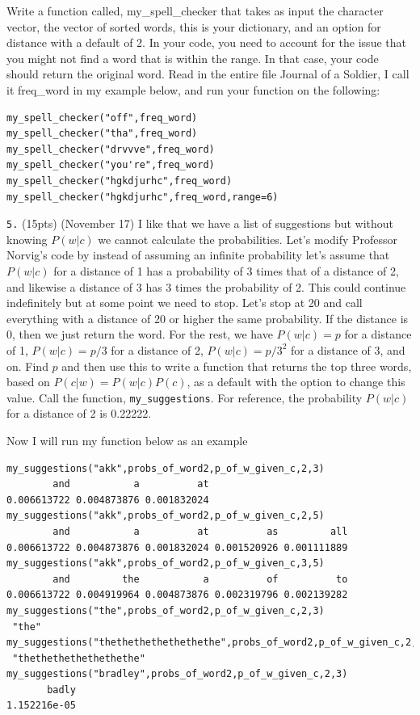 \documentclass[]{book}
\theoremstyle{definition}
\theoremstyle{definition}
\theoremstyle{definition}
\theoremstyle{remark}
\begin{document}
Write a function called, my\_spell\_checker that takes as input the
character vector, the vector of sorted words, this is your dictionary,
and an option for distance with a default of 2. In your code, you need
to account for the issue that you might not find a word that is within
the range. In that case, your code should return the original word. Read
in the entire file Journal of a Soldier, I call it freq\_word in my
example below, and run your function on the following:

\begin{verbatim}
my_spell_checker("off",freq_word)
my_spell_checker("tha",freq_word)
my_spell_checker("drvvve",freq_word)
my_spell_checker("you're",freq_word)
my_spell_checker("hgkdjurhc",freq_word)
my_spell_checker("hgkdjurhc",freq_word,range=6)
\end{verbatim}

\texttt{5.} (15pts) (November 17) I like that we have a list of
suggestions but without knowing \(P(w|c)\) we cannot calculate the
probabilities. Let's modify Professor Norvig's code by instead of
assuming an infinite probability let's assume that \(P(w|c)\) for a
distance of 1 has a probability of 3 times that of a distance of 2, and
likewise a distance of 3 has 3 times the probability of 2. This could
continue indefinitely but at some point we need to stop. Let's stop at
20 and call everything with a distance of 20 or higher the same
probability. If the distance is 0, then we just return the word. For the
rest, we have \(P(w|c)=p\) for a distance of 1, \(P(w|c)=p/3\) for a
distance of 2, \(P(w|c)=p/3^2\) for a distance of 3, and on. Find \(p\)
and then use this to write a function that returns the top three words,
based on \(P(c|w)=P(w|c)P(c)\), as a default with the option to change
this value. Call the function, \texttt{my\_suggestions}. For reference,
the probability \(P(w|c)\) for a distance of 2 is 0.22222.

Now I will run my function below as an example

\begin{verbatim}
my_suggestions("akk",probs_of_word2,p_of_w_given_c,2,3)  
        and           a          at   
0.006613722 0.004873876 0.001832024   
my_suggestions("akk",probs_of_word2,p_of_w_given_c,2,5)  
        and           a          at          as         all   
0.006613722 0.004873876 0.001832024 0.001520926 0.001111889   
my_suggestions("akk",probs_of_word2,p_of_w_given_c,3,5)  
        and         the           a          of          to   
0.006613722 0.004919964 0.004873876 0.002319796 0.002139282   
my_suggestions("the",probs_of_word2,p_of_w_given_c,2,3)  
 "the"  
my_suggestions("thethethethethethethe",probs_of_word2,p_of_w_given_c,2,3)  
 "thethethethethethethe"  
my_suggestions("bradley",probs_of_word2,p_of_w_given_c,2,3)  
       badly   
1.152216e-05   
\end{verbatim}
\end{document}
